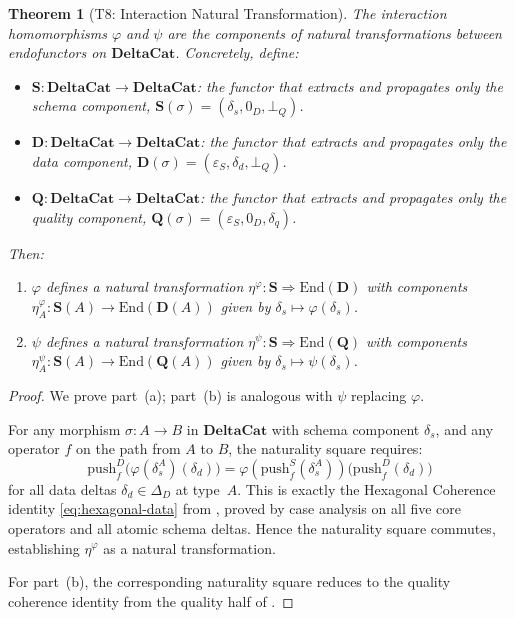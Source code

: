 \documentclass[11pt,a4paper]{article}
\newtheorem{theorem}{Theorem}[section]
\theoremstyle{definition}
\newcommand{\DeltaD}{\Delta_{\!D}}
\newcommand{\epsS}{\varepsilon_S}
\newcommand{\zeroD}{0_D}
\newcommand{\botQ}{\bot_Q}
\newcommand{\push}{\mathrm{push}}
\begin{document}
\begin{theorem}[T8: Interaction Natural Transformation]\label{thm:natural-transform}
The interaction homomorphisms $\varphi$ and $\psi$ are the components of natural
transformations between endofunctors on $\mathbf{DeltaCat}$.  Concretely, define:
\begin{itemize}[nosep]
  \item $\mathbf{S}\colon \mathbf{DeltaCat} \to \mathbf{DeltaCat}$: the functor
    that extracts and propagates only the schema component,
    $\mathbf{S}(\sigma) = (\delta_s, \zeroD, \botQ)$.
  \item $\mathbf{D}\colon \mathbf{DeltaCat} \to \mathbf{DeltaCat}$: the functor
    that extracts and propagates only the data component,
    $\mathbf{D}(\sigma) = (\epsS, \delta_d, \botQ)$.
  \item $\mathbf{Q}\colon \mathbf{DeltaCat} \to \mathbf{DeltaCat}$: the functor
    that extracts and propagates only the quality component,
    $\mathbf{Q}(\sigma) = (\epsS, \zeroD, \delta_q)$.
\end{itemize}
Then:
\begin{enumerate}[label=(\alph*)]
  \item $\varphi$ defines a natural transformation
    $\eta^\varphi\colon \mathbf{S} \Rightarrow \mathrm{End}(\mathbf{D})$
    with components $\eta^\varphi_A\colon \mathbf{S}(A) \to
    \mathrm{End}(\mathbf{D}(A))$ given by $\delta_s \mapsto \varphi(\delta_s)$.
  \item $\psi$ defines a natural transformation
    $\eta^\psi\colon \mathbf{S} \Rightarrow \mathrm{End}(\mathbf{Q})$
    with components $\eta^\psi_A\colon \mathbf{S}(A) \to
    \mathrm{End}(\mathbf{Q}(A))$ given by $\delta_s \mapsto \psi(\delta_s)$.
\end{enumerate}
\end{theorem}

\begin{proof}
We prove part~(a); part~(b) is analogous with $\psi$ replacing $\varphi$.

For any morphism $\sigma\colon A \to B$ in $\mathbf{DeltaCat}$ with schema
component $\delta_s$, and any operator $f$ on the path from $A$ to $B$, the
naturality square requires:
\[
\push_f^D\bigl(\varphi(\delta_s^A)(\delta_d)\bigr)
= \varphi(\push_f^S(\delta_s^A))\bigl(\push_f^D(\delta_d)\bigr)
\]
for all data deltas $\delta_d \in \DeltaD$ at type~$A$.  This is exactly the
Hexagonal Coherence identity \eqref{eq:hexagonal-data} from ,
proved by case analysis on all five core operators and all atomic schema deltas.
Hence the naturality square commutes, establishing $\eta^\varphi$ as a natural
transformation.

For part~(b), the corresponding naturality square reduces to the quality
coherence identity from the quality half of .
\end{proof}
\end{document}
